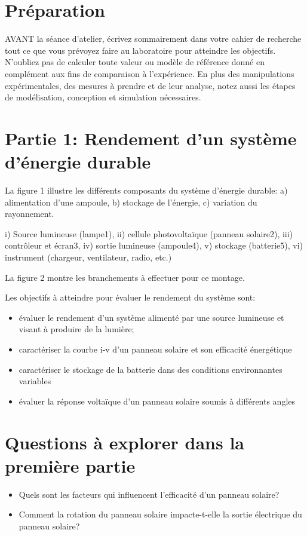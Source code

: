 \documentclass[canadien,12pt,oneside,letterpaper]{article}
\begin{document}
\section{Préparation}\label{sec:preparation}
\vspace{-2ex}
AVANT la séance d’atelier, écrivez sommairement dans votre cahier de recherche
tout ce que vous prévoyez faire au laboratoire pour atteindre les objectifs. N’oubliez
pas de calculer toute valeur ou modèle de référence donné en complément aux fins de
comparaison à l’expérience. En plus des manipulations expérimentales, des mesures
à prendre et de leur analyse, notez aussi les étapes de modélisation, conception et
simulation nécessaires. 


\section{Partie 1: Rendement d'un système d'énergie durable}\label{sec:partie1}
\vspace{-2ex}

La figure 1 illustre les différents composants du système d'énergie durable: a)  alimentation d'une ampoule, b) stockage de l'énergie, c) variation du rayonnement.

i) Source lumineuse (lampe1), ii) cellule photovoltaïque (panneau solaire2), iii) contrôleur et écran3, iv) sortie lumineuse (ampoule4), v) stockage (batterie5), vi) instrument (chargeur, ventilateur, radio, etc.)

La figure 2 montre les branchements à effectuer pour ce montage.

 
Les objectifs à atteindre pour évaluer le rendement du système sont:
\begin{itemize}
\item évaluer le rendement d'un système alimenté par une source lumineuse et visant à produire de la lumière;
\item caractériser la courbe i-v d'un panneau solaire et son efficacité énergétique
\item caractériser le stockage de la batterie dans des conditions environnantes variables
\item évaluer la réponse voltaïque d'un panneau solaire soumis à différents angles
\end{itemize}


\section{Questions à explorer dans la première partie}
\begin{itemize}
\item Quels sont les facteurs qui influencent l'efficacité d'un panneau solaire? 
\item Comment la rotation du panneau solaire impacte-t-elle la sortie électrique du panneau solaire?
\end{itemize}
\end{document}
